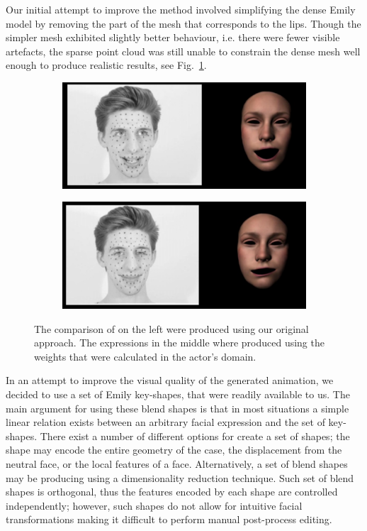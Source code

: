 \documentclass[11pt]{report}
\begin{document}
Our initial attempt to improve the method involved simplifying the dense Emily model by removing the part of the mesh that corresponds to the lips. Though the simpler mesh exhibited slightly better behaviour, i.e. there were fewer visible artefacts, the sparse point cloud was still unable to constrain the dense mesh well enough to produce realistic results, see Fig.~\ref{fig:ghost}. 
\begin{figure}[htbp!]
        \centering
        \begin{subfigure}[b]{0.45\textwidth}
                \includegraphics[width=\textwidth]{img/ghost1.png}
        \end{subfigure}
        \begin{subfigure}[b]{0.45\textwidth}
                \includegraphics[width=\textwidth]{img/ghost2.png}
        \end{subfigure}
        \caption{The comparison of on the left were produced using our original approach. The expressions in the middle where produced using the weights that were calculated in the actor's domain. }\label{fig:ghost}
\end{figure}

In an attempt to improve the visual quality of the generated animation, we decided to use a set of Emily key-shapes, that were readily available to us. The main argument for using these blend shapes is that in most situations a simple linear relation exists between an arbitrary facial expression and the set of key-shapes. There exist a number of different options for create a set of shapes; the shape may encode the entire geometry of the case, the displacement from the neutral face, or the local features of a face. Alternatively, a set of blend shapes may be producing using a dimensionality reduction technique. Such set of blend shapes is orthogonal, thus the features encoded by each shape are controlled independently; however, such shapes do not allow for intuitive facial transformations making it difficult to perform manual post-process editing.
\end{document}
